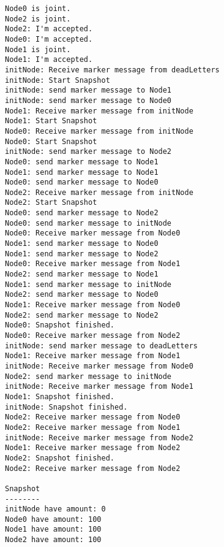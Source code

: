 \begin{lstlisting}[basicstyle=\tiny,caption={Beispiel Ablauf des Snapshot Algorithmus mit 3 Knoten neben dem initKnoten}, label=lst:testss]
Node0 is joint.
Node2 is joint.
Node2: I'm accepted.
Node0: I'm accepted.
Node1 is joint.
Node1: I'm accepted.
initNode: Receive marker message from deadLetters
initNode: Start Snapshot
initNode: send marker message to Node1
initNode: send marker message to Node0
Node1: Receive marker message from initNode
Node1: Start Snapshot
Node0: Receive marker message from initNode
Node0: Start Snapshot
initNode: send marker message to Node2
Node0: send marker message to Node1
Node1: send marker message to Node1
Node0: send marker message to Node0
Node2: Receive marker message from initNode
Node2: Start Snapshot
Node0: send marker message to Node2
Node0: send marker message to initNode
Node0: Receive marker message from Node0
Node1: send marker message to Node0
Node1: send marker message to Node2
Node0: Receive marker message from Node1
Node2: send marker message to Node1
Node1: send marker message to initNode
Node2: send marker message to Node0
Node1: Receive marker message from Node0
Node2: send marker message to Node2
Node0: Snapshot finished.
Node0: Receive marker message from Node2
initNode: send marker message to deadLetters
Node1: Receive marker message from Node1
initNode: Receive marker message from Node0
Node2: send marker message to initNode
initNode: Receive marker message from Node1
Node1: Snapshot finished.
initNode: Snapshot finished.
Node2: Receive marker message from Node0
Node2: Receive marker message from Node1
initNode: Receive marker message from Node2
Node1: Receive marker message from Node2
Node2: Snapshot finished.
Node2: Receive marker message from Node2

Snapshot
--------
initNode have amount: 0
Node0 have amount: 100
Node1 have amount: 100
Node2 have amount: 100
\end{lstlisting}
